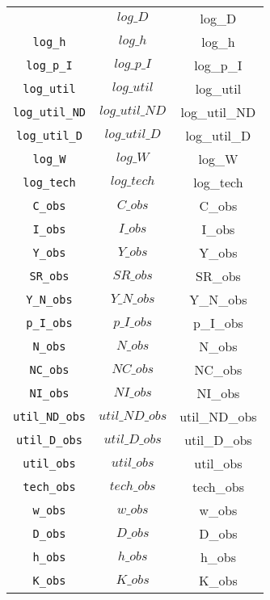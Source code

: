 \begin{center}
\begin{longtable}{ccc}
{\texttt{log\_D} & $log\_D$ & log\_D\\
\texttt{log\_h} & $log\_h$ & log\_h\\
\texttt{log\_p\_I} & $log\_p\_I$ & log\_p\_I\\
\texttt{log\_util} & $log\_util$ & log\_util\\
\texttt{log\_util\_ND} & $log\_util\_ND$ & log\_util\_ND\\
\texttt{log\_util\_D} & $log\_util\_D$ & log\_util\_D\\
\texttt{log\_W} & $log\_W$ & log\_W\\
\texttt{log\_tech} & $log\_tech$ & log\_tech\\
\texttt{C\_obs} & $C\_obs$ & C\_obs\\
\texttt{I\_obs} & $I\_obs$ & I\_obs\\
\texttt{Y\_obs} & $Y\_obs$ & Y\_obs\\
\texttt{SR\_obs} & $SR\_obs$ & SR\_obs\\
\texttt{Y\_N\_obs} & $Y\_N\_obs$ & Y\_N\_obs\\
\texttt{p\_I\_obs} & $p\_I\_obs$ & p\_I\_obs\\
\texttt{N\_obs} & $N\_obs$ & N\_obs\\
\texttt{NC\_obs} & $NC\_obs$ & NC\_obs\\
\texttt{NI\_obs} & $NI\_obs$ & NI\_obs\\
\texttt{util\_ND\_obs} & $util\_ND\_obs$ & util\_ND\_obs\\
\texttt{util\_D\_obs} & $util\_D\_obs$ & util\_D\_obs\\
\texttt{util\_obs} & $util\_obs$ & util\_obs\\
\texttt{tech\_obs} & $tech\_obs$ & tech\_obs\\
\texttt{w\_obs} & $w\_obs$ & w\_obs\\
\texttt{D\_obs} & $D\_obs$ & D\_obs\\
\texttt{h\_obs} & $h\_obs$ & h\_obs\\
\texttt{K\_obs} & $K\_obs$ & K\_obs\\
\hline%
\end{longtable}
\end{center}
